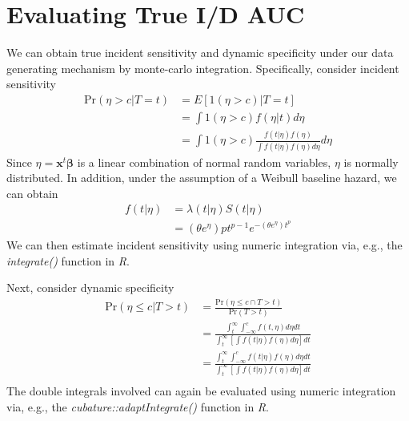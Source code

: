 \documentclass[useAMS,usenatbib, referee]{biom}
\begin{document}




\appendix


\section{Evaluating True I/D AUC}
We can obtain true incident sensitivity and dynamic specificity under our data generating mechanism by monte-carlo integration. Specifically, consider incident sensitivity
\begin{align*}
    \text{Pr}(\eta > c|T = t) 
    &= E[1(\eta > c) | T = t] \\
    &= \int 1(\eta > c) f(\eta | t) d\eta \\
    &= \int 1(\eta > c) \frac{f(t|\eta)f(\eta)}{\int f(t|\eta) f(\eta)d\eta}d\eta
\end{align*}
Since $\eta = \bm{x}^t \bm{\beta}$ is a linear combination of normal random variables, 
$\eta$ is normally distributed. In addition, under the assumption of a Weibull baseline hazard, we can obtain 
\begin{align*}
    f( t| \eta) 
    &= \lambda(t|\eta)S(t|\eta) \\
    &= (\theta e^{\eta})p t^{p-1} e^{-(\theta e^{\eta}) t^p }
\end{align*}
We can then estimate incident sensitivity using numeric integration via, e.g., the {\it integrate()} function in {\it R}.

Next, consider dynamic specificity
\begin{align*}
    \text{Pr}(\eta \leq c|T > t) 
    &= \frac{\text{Pr}(\eta \leq c \cap T > t)}{\text{Pr}(T > t) } \\
    &= \frac{\int_t^\infty \int_{-\infty}^c f(t,\eta)d\eta dt }{\int_t^\infty [\int f(t|\eta)f(\eta)d\eta]dt } \\
        &= \frac{\int_t^\infty \int_{-\infty}^c f(t|\eta)f(\eta) d\eta dt }{\int_t^\infty [\int f(t|\eta)f(\eta)d\eta] dt} \\
\end{align*}
The double integrals involved can again be evaluated using numeric integration via, e.g., the {\it cubature::adaptIntegrate()} function in {\it R}.
\end{document}
